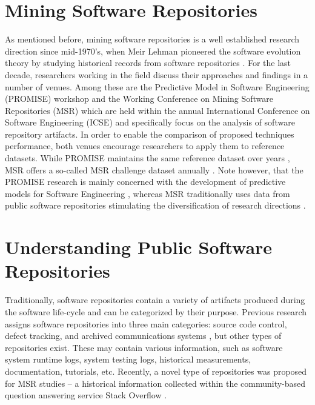 \section{Mining Software Repositories}
As mentioned before, mining software repositories is a well established research direction since 
mid-1970's, when Meir Lehman pioneered the software evolution theory by studying historical records from 
software repositories \cite{citeulike:2739216}. 
For the last decade, researchers working in the field discuss their approaches and findings in a number of venues. 
Among these are the Predictive Model in Software Engineering (PROMISE) workshop and the Working Conference on Mining 
Software Repositories (MSR) which are held within the annual International Conference on Software Engineering (ICSE)
and specifically focus on the analysis of software repository artifacts.
In order to enable the comparison of proposed techniques performance, both venues encourage researchers to 
apply them to reference datasets. 
While PROMISE maintains the same reference dataset over years \cite{promise12}, 
MSR offers a so-called MSR challenge dataset annually \cite{MSRChallenge2012} \cite{MSRChallenge2013}.
Note however, that the {PROMISE} research is mainly concerned with the development of predictive models for 
Software Engineering \cite{Menzies13}, whereas MSR traditionally uses data from public software repositories stimulating 
the diversification of research directions \cite{citeulike:12550438} \cite{citeulike:2710928} \cite{citeulike:7853299}.

\section{Understanding Public Software Repositories}\label{section_understanding}
Traditionally, software repositories contain a variety of artifacts produced during the software life-cycle
and can be categorized by their purpose.
Previous research assigns software repositories into three main categories: source code control, 
defect tracking, and archived communications systems \cite{citeulike:4534888}, but other types of repositories exist. 
These may contain various information, such as software system runtime logs, system testing logs, 
historical measurements, documentation, tutorials, etc.
Recently, a novel type of repositories was proposed for MSR studies -- a historical information collected within the 
community-based question answering service Stack Overflow \cite{MSRChallenge2013}.

